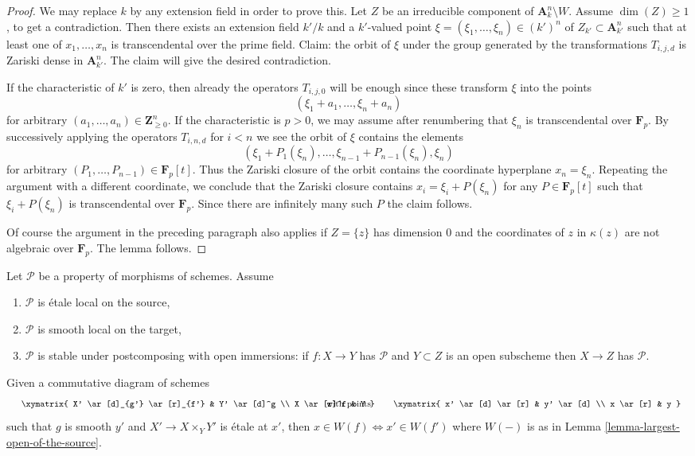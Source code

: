 \begin{proof}
We may replace $k$ by any extension field in order to prove this.
Let $Z$ be an irreducible component of $\mathbf{A}^n_k \setminus W$.
Assume $\dim(Z) \geq 1$, to get a contradiction.
Then there exists an extension field $k'/k$ and a $k'$-valued
point $\xi = (\xi_1, \ldots, \xi_n) \in (k')^n$ of
$Z_{k'} \subset \mathbf{A}^n_{k'}$
such that at least one of $x_1, \ldots, x_n$ is transcendental over the
prime field. Claim: the orbit of $\xi$ under the group generated by
the transformations $T_{i, j, d}$ is Zariski
dense in $\mathbf{A}^n_{k'}$. The claim will give the desired contradiction.

\medskip\noindent
If the characteristic of $k'$ is zero, then already the operators
$T_{i, j, 0}$ will be enough since these transform $\xi$ into
the points
$$
(\xi_1 + a_1, \ldots, \xi_n + a_n)
$$
for arbitrary $(a_1, \ldots, a_n) \in \mathbf{Z}_{\geq 0}^n$.
If the characteristic is $p > 0$, we may assume after renumbering
that $\xi_n$ is transcendental over $\mathbf{F}_p$. By
successively applying the operators $T_{i, n, d}$ for
$i < n$ we see the orbit of $\xi$ contains the elements
$$
(\xi_1 + P_1(\xi_n), \ldots, \xi_{n - 1} + P_{n - 1}(\xi_n), \xi_n)
$$
for arbitrary $(P_1, \ldots, P_{n - 1}) \in \mathbf{F}_p[t]$.
Thus the Zariski closure of the orbit contains the coordinate
hyperplane $x_n = \xi_n$. Repeating the argument with a different
coordinate, we conclude that the Zariski closure contains
$x_i = \xi_i + P(\xi_n)$ for any $P \in \mathbf{F}_p[t]$
such that $\xi_i + P(\xi_n)$ is transcendental over $\mathbf{F}_p$.
Since there are infinitely many such $P$ the claim follows.

\medskip\noindent
Of course the argument in the preceding paragraph also applies
if $Z = \{z\}$ has dimension $0$ and the coordinates of $z$
in $\kappa(z)$ are not algebraic over $\mathbf{F}_p$. The lemma follows.
\end{proof}

\begin{lemma}
\label{lemma-etale-tau-local-source-target}
Let $\mathcal{P}$ be a property of morphisms of schemes. Assume
\begin{enumerate}
\item $\mathcal{P}$ is \'etale local on the source,
\item $\mathcal{P}$ is smooth local on the target,
\item $\mathcal{P}$ is stable under postcomposing with open immersions:
if $f : X \to Y$ has $\mathcal{P}$ and $Y \subset Z$ is an open
subscheme then $X \to Z$ has $\mathcal{P}$.
\end{enumerate}
Given a commutative diagram of schemes
$$
\vcenter{
\xymatrix{
X' \ar[d]_{g'} \ar[r]_{f'} & Y' \ar[d]^g \\
X \ar[r]^f & Y
}
}
\quad\text{with points}\quad
\vcenter{
\xymatrix{
x' \ar[d] \ar[r] & y' \ar[d] \\
x \ar[r] & y
}
}
$$
such that $g$ is smooth $y'$ and $X' \to X \times_Y Y'$ is \'etale
at $x'$, then $x \in W(f) \Leftrightarrow x' \in W(f')$
where $W(-)$ is as in Lemma \ref{lemma-largest-open-of-the-source}.
\end{lemma}

